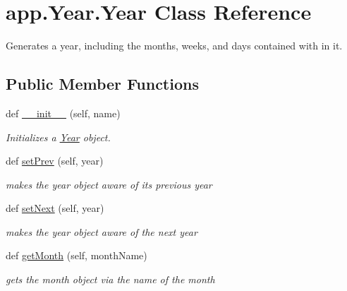 \hypertarget{classapp_1_1Year_1_1Year}{}\section{app.\+Year.\+Year Class Reference}
\label{classapp_1_1Year_1_1Year}


Generates a year, including the months, weeks, and days contained with in it.  


\subsection*{Public Member Functions}
\begin{DoxyCompactItemize}
\item 
def \hyperlink{classapp_1_1Year_1_1Year_a7137b85e17cf71cb61a4eaf1b46be837}{\+\_\+\+\_\+init\+\_\+\+\_\+} (self, name)
\begin{DoxyCompactList}\small\item\em Initializes a \hyperlink{classapp_1_1Year_1_1Year}{Year} object. \end{DoxyCompactList}\item 
def \hyperlink{classapp_1_1Year_1_1Year_a4fc579bd5b473c0898ae41902b084f80}{set\+Prev} (self, year)
\begin{DoxyCompactList}\small\item\em makes the year object aware of its previous year \end{DoxyCompactList}\item 
def \hyperlink{classapp_1_1Year_1_1Year_aa68562faa318617f6c4c90919d27d195}{set\+Next} (self, year)
\begin{DoxyCompactList}\small\item\em makes the year object aware of the next year \end{DoxyCompactList}\item 
def \hyperlink{classapp_1_1Year_1_1Year_ad1d40047ed4bff44be11156937427ceb}{get\+Month} (self, month\+Name)
\begin{DoxyCompactList}\small\item\em gets the month object via the name of the month \end{DoxyCompactList}\end{DoxyCompactItemize}
